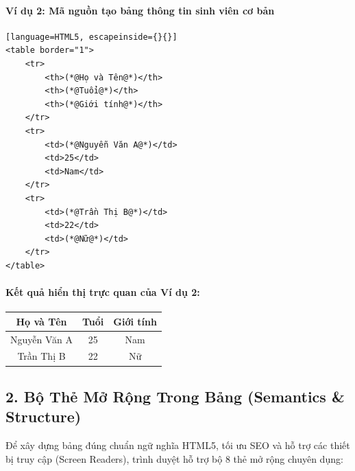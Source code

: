 \documentclass[11pt,oneside]{book}
\renewcommand{\arraystretch}{1.2}
\begin{document}
\paragraph{Ví dụ 2: Mã nguồn tạo bảng thông tin sinh viên cơ bản}
\begin{codeWindow}
\begin{lstlisting}[language=HTML5, escapeinside={}{}]
<table border="1">
    <tr>
        <th>(*@Họ và Tên@*)</th>
        <th>(*@Tuổi@*)</th>
        <th>(*@Giới tính@*)</th>
    </tr>
    <tr>
        <td>(*@Nguyễn Văn A@*)</td>
        <td>25</td>
        <td>Nam</td>
    </tr>
    <tr>
        <td>(*@Trần Thị B@*)</td>
        <td>22</td>
        <td>(*@Nữ@*)</td>
    </tr>
</table>
\end{lstlisting}
\end{codeWindow}

\paragraph{\textbf{Kết quả hiển thị trực quan của Ví dụ 2:}}
\begin{prettyTableBox}[Kết Quả Hiển Thị Bảng HTML Khi Khai Báo Thuộc Tính border="1"]
\centering
\vspace{4pt}
\bgroup
\renewcommand{\arraystretch}{1.4}
\setlength{\tabcolsep}{14pt}
\begin{tabular}{|c|c|c|}
\hline
\textbf{Họ và Tên} & \textbf{Tuổi} & \textbf{Giới tính} \\
\hline
Nguyễn Văn A & 25 & Nam \\
\hline
Trần Thị B & 22 & Nữ \\
\hline
\end{tabular}
\egroup
\vspace{4pt}
\end{prettyTableBox}

\subsection{2. Bộ Thẻ Mở Rộng Trong Bảng (Semantics \& Structure)}

Để xây dựng bảng đúng chuẩn ngữ nghĩa HTML5, tối ưu SEO và hỗ trợ các thiết bị truy cập (Screen Readers), trình duyệt hỗ trợ bộ 8 thẻ mở rộng chuyên dụng:
\end{document}
